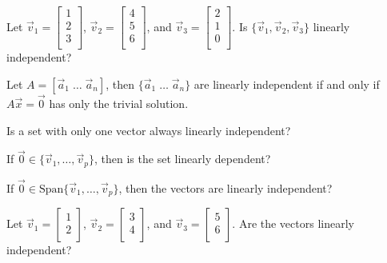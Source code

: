 \documentclass[12pt,letterpaper]{article}
\begin{document}
\begin{enumerate}

\Problem Let $\vec{v}_1=\begin{bmatrix} 1\\2\\3\\ \end{bmatrix}$, $\vec{v}_2=\begin{bmatrix} 4\\5\\6\\ \end{bmatrix}$, and $\vec{v}_3=\begin{bmatrix} 2\\1\\0\\ \end{bmatrix}$. Is $\{ \vec{v}_1, \vec{v}_2,\vec{v}_3 \}$ linearly independent?

\vfill

\vfill

\vfill

Let $A= [\vec{a}_1 \; \dots \; \vec{a}_n ]$, then $\{ \vec{a}_1 \; \dots \; \vec{a}_n \}$ are linearly independent if and only if $A \vec{x} = \vec{0}$ has only the trivial solution.

\Problem Is a set with only one vector always linearly independent?

\vfill

\Problem If $\vec{0} \in \{ \vec{v}_1, \dots, \vec{v}_p \}$, then is the set linearly dependent?

\vfill

\Problem If $\vec{0} \in \text{Span}\{ \vec{v}_1, \dots, \vec{v}_p \}$, then the vectors are linearly independent?

\vfill

\newpage

\Problem Let $\vec{v}_1=\begin{bmatrix} 1\\2\\ \end{bmatrix}$, $\vec{v}_2=\begin{bmatrix} 3\\4\\ \end{bmatrix}$, and $\vec{v}_3=\begin{bmatrix} 5\\6\\ \end{bmatrix}$. Are the vectors linearly independent?


\end{enumerate}
\end{document}
